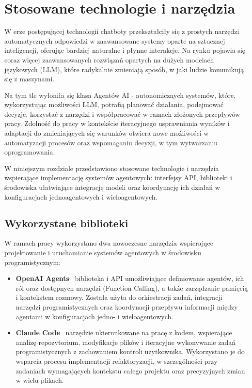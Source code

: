 \newpage
\section{Stosowane technologie i narzędzia}
W erze postępującej technologii chatboty przekształciły się z prostych narzędzi automatycznych odpowiedzi w zaawansowane systemy oparte na sztucznej inteligencji, oferując bardziej naturalne i płynne interakcje. Na rynku pojawia się coraz więcej zaawansowanych rozwiązań opartych na dużych modelach językowych (LLM), które radykalnie zmieniają sposób, w jaki ludzie komunikują się z maszynami.

Na tym tle wyłoniła się klasa Agentów AI - autonomicznych systemów, które, wykorzystując możliwości LLM, potrafią planować działania, podejmować decyzje, korzystać z narzędzi i współpracować w ramach złożonych przepływów
pracy. Zdolność do pracy w kontekście iteracyjnego usprawniania wyników i adaptacji do zmieniających się warunków otwiera nowe możliwości w automatyzacji procesów oraz wspomaganiu decyzji, w tym wytwarzaniu oprogramowania.

W niniejszym rozdziale przedstawiono stosowane technologie i narzędzia wspierające implementację systemów agentowych: interfejsy API, biblioteki i środowiska ułatwiające integrację modeli oraz koordynację ich działań w konfiguracjach jednoagentowych i wieloagentowych.

\subsection{Wykorzystane biblioteki}
W ramach pracy wykorzystano dwa nowoczesne narzędzia wspierające projektowanie i uruchamianie systemów agentowych w
środowisku programistycznym:
\begin{itemize}
  \item \textbf{OpenAI Agents} \textendash\  biblioteka i API umożliwiające definiowanie agentów, ich ról oraz dostępnych narzędzi (Function Calling), a także zarządzanie pamięcią i kontekstem rozmowy. Została użyta do orkiestracji zadań, integracji narzędzi programistycznych oraz koordynacji przepływu informacji między agentami w konfiguracjach jedno- i wieloagentowych.
  \item \textbf{Claude Code} \textendash\  narzędzie ukierunkowane na pracę z kodem, wspierające analizę repozytorium, modyfikacje plików i iteracyjne wykonywanie zadań programistycznych z zachowaniem kontroli użytkownika. Wykorzystano je do wsparcia procesu implementacji  refaktoryzacji, w szczególności przy zadaniach wymagających kontekstu całego projektu oraz precyzyjnych zmian w wielu plikach.
\end{itemize}


